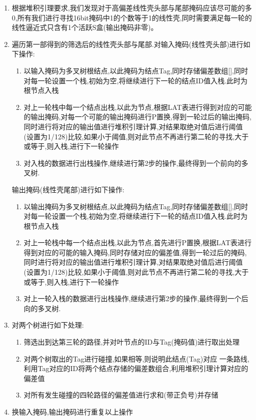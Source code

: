 \documentclass[UTF-8]{ctexart}
\begin{document}
\begin{enumerate}
	\item 根据堆积引理要求,我们发现对于高偏差线性壳头部与尾部掩码应该尽可能的多0,所有我们进行寻找16bit掩码中1的个数等于1的线性壳,同时需要满足每一轮的线性逼近式只含有1个活跃S盒(输出掩码非零)。
	\item 遍历第一部得到的筛选后的线性壳头部与尾部.对输入掩码(线性壳头部)进行如下操作:
	\begin{enumerate}
		\item 以输入掩码为多叉树根结点,以此掩码为结点Tag,同时存储偏差数组[],同时对每一轮设置一个栈,初始为空,将继续进行下一轮的结点ID值入栈.此时为根节点入栈
		\item 对上一轮栈中每一个结点出栈,以此为节点,根据LAT表进行得到对应的可能的输出掩码,对每一个可能的输出掩码进行P置换,得到一轮过后的输出掩码,同时进行将对应的输出值进行堆积引理计算,对结果取绝对值后进行阈值(设置为1/128)比较,如果小于阈值,则对此节点不再进行第二轮的寻找,大于或等于,则入栈,进行下一轮操作
		\item 对入栈的数据进行出栈操作,继续进行第2步的操作,最终得到一个前向的多叉树.
	\end{enumerate}
输出掩码(线性壳尾部)进行如下操作:
\begin{enumerate}
	\item 以输出掩码为多叉树根结点,以此掩码为结点Tag,同时存储偏差数组[],同时对每一轮设置一个栈,初始为空,将继续进行下一轮的结点ID值入栈.此时为根节点入栈
	\item 对上一轮栈中每一个结点出栈,以此为节点,首先进行P置换,根据LAT表进行得到对应的可能的输入掩码,同时存储对应的偏差值,得到一轮过后的掩码,同时进行将对应的输出值进行堆积引理计算,对结果取绝对值后进行阈值(设置为1/128)比较,如果小于阈值,则对此节点不再进行第二轮的寻找,大于或等于,则入栈,进行下一轮操作
	\item 对上一轮入栈的数据进行出栈操作,继续进行第2步的操作,最终得到一个后向的多叉树.
\end{enumerate}
	\item 对两个树进行如下处理:
	\begin{enumerate}
		\item 筛选出到达第三轮的路径,并对叶节点的ID与Tag(掩码值)进行取出处理
		\item 对两个树取出的Tag进行碰撞,如果相等,则说明此结点(Tag)对应
	一条路线,利用Tag对应的ID将两个结点存储的偏差数组合,利用堆积引理计算对应的偏差值
		\item 对所有发生碰撞的四轮路径的偏差值进行求和(带正负号)并存储
	\end{enumerate}
	\item 换输入掩码,输出掩码进行重复以上操作
\end{enumerate}
\end{document}
